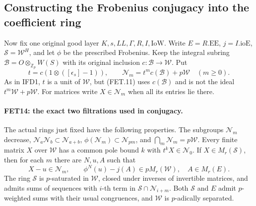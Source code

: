 \subsection{Constructing the Frobenius conjugacy into the coefficient ring}

Now fix one original good layer $K,s,LL,\Gamma,R,I,\mathrm{IoW}$.
Write $E=R.\mathrm{EE}$, $j=I.\mathrm{ioE}$,
$\mathcal S=\mathcal W^H$, and let $\phi$ be the prescribed
Frobenius. Keep the integral subring
$\mathcal B=O\otimes_{\mathbb Z_p}W(S)$ with its original
inclusion $c:\mathcal B\to\mathcal W$. Put
\[
 t=c(1\otimes([\epsilon_s]-1)),\qquad
 \mathcal N_m=t^m c(\mathcal B)+p\mathcal W\quad(m\geq0).
                                                               \tag{FET.11}
\]
As in IFD1, $t$ is a unit of $\mathcal W$, but (FET.11)
uses $c(\mathcal B)$ and is not the ideal
$t^m\mathcal W+p\mathcal W$. For matrices write
$X\in\mathcal N_m$ when all its entries lie there.

\paragraph{FET14: the exact two filtrations used in conjugacy.}
\label{claim:FET14}
The actual rings just fixed have the following properties.
The subgroups $\mathcal N_m$ decrease,
$\mathcal N_a\mathcal N_b\subset\mathcal N_{a+b}$,
$\phi(\mathcal N_m)\subset\mathcal N_{pm}$, and
$\bigcap_m\mathcal N_m=p\mathcal W$.
Every finite matrix $X$ over $\mathcal W$ has a common pole bound
$k$ with $t^kX\in\mathcal N_0$.
If $X\in M_r(\mathcal S)$, then for each $m$ there are $N,u,A$
such that
\[
 X-u\in\mathcal N_m,\qquad
                \phi^N(u)-j(A)\in pM_r(\mathcal W),
                         \quad A\in M_r(E).               \tag{FET.12}
\]
The ring $\mathcal S$ is $p$-saturated in $\mathcal W$, closed
under inverses of invertible matrices, and admits sums of sequences
with $i$-th term in $\mathcal S\cap\mathcal N_{i+m}$.
Both $\mathcal S$ and $E$ admit $p$-weighted sums with their
usual congruences, and $\mathcal W$ is $p$-adically separated.

